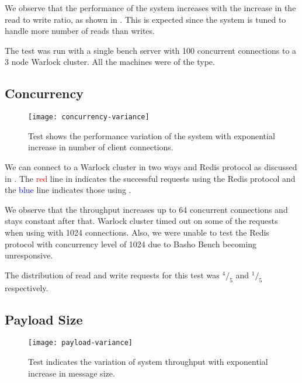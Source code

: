 We observe that the performance of the system increases with the increase in
the read to write ratio, as shown in . This is
expected since the system is tuned to handle more number of reads than writes.

The test was run with a single bench server with 100 concurrent connections to
a 3 node Warlock cluster. All the machines were of the  type.

\subsection{Concurrency}

\begin{figure}
  \begin{whole}
    \texttt{[image: concurrency-variance]}
    \caption[Concurrency Test]{%
      Test shows the performance variation of the system with exponential
      increase in number of client connections.
    }
    \label{figure:res.concurrency}
  \end{whole}
\end{figure}

We can connect to a Warlock cluster in two ways \dash{}  and Redis
protocol
as discussed in . The \textcolor{red}{red} line
in  indicates the successful requests using the
Redis protocol and the \textcolor{blue}{blue} line indicates those using
.

We observe that the throughput increases up to 64 concurrent connections and
stays constant after that. Warlock cluster timed out on some of the requests
when using  with 1024 connections. Also, we were unable to test the
Redis protocol
with concurrency level of 1024 due to Basho Bench becoming unresponsive.

The distribution of read and write requests for this test was ${}^4/_5$ and
${}^1/_5$ respectively.

\subsection{Payload Size}

\begin{figure}
  \begin{whole}
    \texttt{[image: payload-variance]}
    \caption[Payload Throughput Test]{%
      Test indicates the variation of system throughput with exponential
      increase in message size.
    }
    \label{figure:res.payload.throughput}
  \end{whole}
\end{figure}

